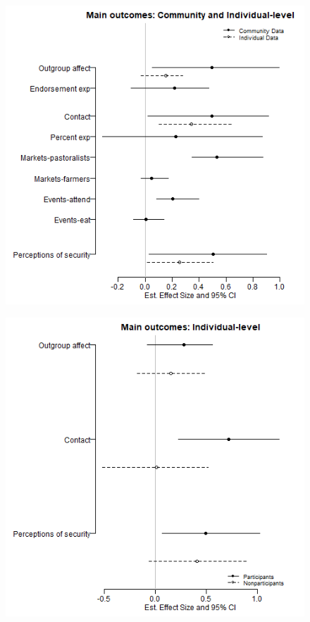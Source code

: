 \documentclass[11pt]{article}
\begin{document}
\begin{figure}[!h]
    \begin{minipage}[b]{.48\textwidth}
        \includegraphics[width=\linewidth]{../../../figs/ecpn_coefplots_MainOuts-cats.png}
        \label{fig:fig1}
    \end{minipage}
    \hfill
    \begin{minipage}[b]{.48\textwidth}
        \includegraphics[width=\linewidth]{../../../figs/ecpn_coefplots_MainOuts_panel-cats.png}
        \label{fig:fig2}
    \end{minipage}
\end{figure}
\end{document}

